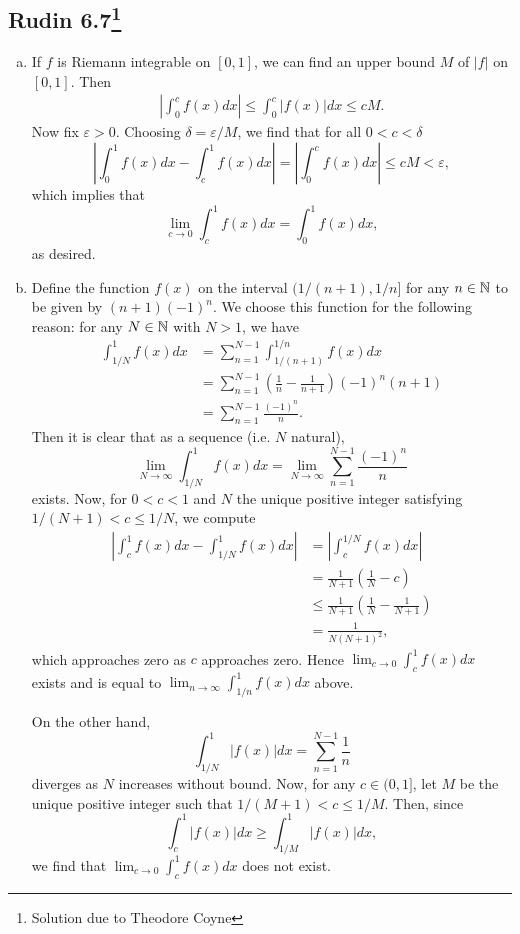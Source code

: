 \documentclass{../mathnotes}
\begin{document}
\subsection*{Rudin 6.7\footnote{Solution due to Theodore Coyne}}
\begin{enumerate}[(a)]
    \item If $f$ is Riemann integrable on $[0,1]$, we can find an upper bound $M$
        of $|f|$ on $[0,1]$. Then
        \begin{align*}
            \left|\int_0^c f(x)dx\right| \leq \int_0^c|f(x)|dx\leq cM.
        \end{align*}
        Now fix $\varepsilon>0$. Choosing $\delta=\varepsilon/M$, we find that for
        all $0<c<\delta$
        \[\left|\int_0^1f(x)dx-\int_c^1f(x)dx\right|=\left|\int_0^cf(x)dx\right|\leq cM<\varepsilon,\]
        which implies that
        \[\lim_{c\to 0}\int_c^1f(x)dx=\int_0^1f(x)dx,\]
        as desired.
    \item Define the function $f(x)$ on the interval $(1/(n+1), 1/n]$ for any $n\in \mathbb{N}$
        to be given by $(n+1)(-1)^n$. We choose this function for the following reason:
        for any $N\in\mathbb{N}$ with $N>1$, we have
        \begin{align*}
            \int_{1/N}^1 f(x)dx &= \sum_{n=1}^{N-1}\int_{1/(n+1)}^{1/n} f(x) dx\\
            &= \sum_{n=1}^{N-1}\left( \frac{1}{n}-\frac{1}{n+1} \right)(-1)^n(n+1)\\
            &=\sum_{n=1}^{N-1}\frac{(-1)^n}{n}.
        \end{align*}
        Then it is clear that as a sequence (i.e. $N$ natural),
        \[\lim_{N\to\infty}\int_{1/N}^1 f(x)dx=\lim_{N\to\infty}\sum_{n=1}^{N-1}\frac{(-1)^n}{n}\]
        exists. Now, for $0<c<1$ and $N$ the unique positive integer satisfying $1/(N+1)<c\leq 1/N$,
        we compute
        \begin{align*}
            \left|\int_c^1f(x)dx - \int_{1/N}^1f(x)dx\right| &= \left|\int_c^{1/N}f(x)dx\right|\\
            &=\frac{1}{N+1}\left( \frac{1}{N}-c \right)\\
            &\leq \frac{1}{N+1}\left( \frac{1}{N}-\frac{1}{N+1} \right)\\
            &=\frac{1}{N(N+1)^2},
        \end{align*}
        which approaches zero as $c$ approaches zero. Hence $\lim_{c\to 0}\int_c^1f(x)dx$ exists
        and is equal to $\lim_{n\to\infty}\int_{1/n}^1f(x)dx$ above.

        On the other hand,
        \[\int_{1/N}^1|f(x)|dx=\sum_{n=1}^{N-1}\frac{1}{n}\]
        diverges as $N$ increases without bound. Now, for any $c\in(0,1]$, let $M$ be the
        unique positive integer such that $1/(M+1)<c\leq 1/M$. Then, since
        \[\int_c^1|f(x)|dx\geq\int_{1/M}^1|f(x)|dx,\]
        we find that $\lim_{c\to0}\int_c^1f(x)dx$ does not exist.
\end{enumerate}
\end{document}
